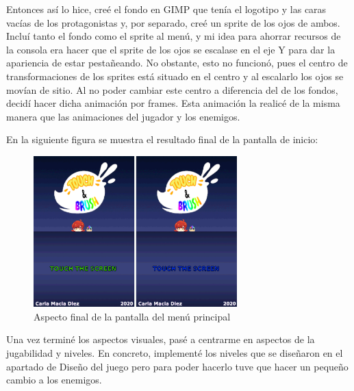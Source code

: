  \vspace{0.5cm}

Entonces así lo hice, creé el fondo en GIMP que tenía el logotipo y las caras vacías de los protagonistas y, por separado, creé un sprite de los ojos de ambos. Incluí tanto el fondo como el sprite al menú, y mi idea para ahorrar recursos de la consola era hacer que el sprite de los ojos se escalase en el eje Y para dar la apariencia de estar pestañeando. No obstante, esto no funcionó, pues el centro de transformaciones de los sprites está situado en el centro y al escalarlo los ojos se movían de sitio. Al no poder cambiar este centro a diferencia del de los fondos, decidí hacer dicha animación por frames. Esta animación la realicé de la misma manera que las animaciones del jugador y los enemigos. 

 \vspace{0.5cm}

En la siguiente figura se muestra el resultado final de la pantalla de inicio:

 \vspace{0.5cm}

\begin{figure}[htbp]
\centering
  \includegraphics[width=0.7\textwidth]{archivos/menu_screen_finished.png}
  \caption{Aspecto final de la pantalla del menú principal}
  \label{fig:menu_screen_finished}
\end{figure}
\vspace{0.5cm}

Una vez terminé los aspectos visuales, pasé a centrarme en aspectos de la jugabilidad y niveles. En concreto, implementé los niveles que se diseñaron en el apartado de Diseño del juego pero para poder hacerlo tuve que hacer un pequeño cambio a los enemigos.

\vspace{0.5cm}

